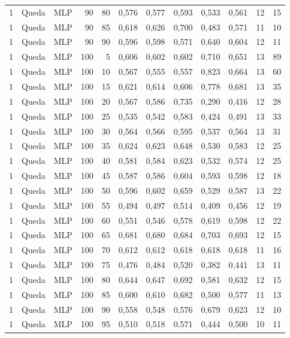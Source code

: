 \begin{longtable}{@{}rllrrrrrrrrr@{}}
1 & Queda & MLP & 90 & 80 & 0,576 & 0,577 & 0,593 & 0,533 & 0,561 & 12 & 15 \\
1 & Queda & MLP & 90 & 85 & 0,618 & 0,626 & 0,700 & 0,483 & 0,571 & 11 & 10 \\
1 & Queda & MLP & 90 & 90 & 0,596 & 0,598 & 0,571 & 0,640 & 0,604 & 12 & 11 \\
1 & Queda & MLP & 100 & 5 & 0,606 & 0,602 & 0,602 & 0,710 & 0,651 & 13 & 89 \\
1 & Queda & MLP & 100 & 10 & 0,567 & 0,555 & 0,557 & 0,823 & 0,664 & 13 & 60 \\
1 & Queda & MLP & 100 & 15 & 0,621 & 0,614 & 0,606 & 0,778 & 0,681 & 13 & 35 \\
1 & Queda & MLP & 100 & 20 & 0,567 & 0,586 & 0,735 & 0,290 & 0,416 & 12 & 28 \\
1 & Queda & MLP & 100 & 25 & 0,535 & 0,542 & 0,583 & 0,424 & 0,491 & 13 & 33 \\
1 & Queda & MLP & 100 & 30 & 0,564 & 0,566 & 0,595 & 0,537 & 0,564 & 13 & 31 \\
1 & Queda & MLP & 100 & 35 & 0,624 & 0,623 & 0,648 & 0,530 & 0,583 & 12 & 25 \\
1 & Queda & MLP & 100 & 40 & 0,581 & 0,584 & 0,623 & 0,532 & 0,574 & 12 & 25 \\
1 & Queda & MLP & 100 & 45 & 0,587 & 0,586 & 0,604 & 0,593 & 0,598 & 12 & 18 \\
1 & Queda & MLP & 100 & 50 & 0,596 & 0,602 & 0,659 & 0,529 & 0,587 & 13 & 22 \\
1 & Queda & MLP & 100 & 55 & 0,494 & 0,497 & 0,514 & 0,409 & 0,456 & 12 & 19 \\
1 & Queda & MLP & 100 & 60 & 0,551 & 0,546 & 0,578 & 0,619 & 0,598 & 12 & 22 \\
1 & Queda & MLP & 100 & 65 & 0,681 & 0,680 & 0,684 & 0,703 & 0,693 & 12 & 15 \\
1 & Queda & MLP & 100 & 70 & 0,612 & 0,612 & 0,618 & 0,618 & 0,618 & 11 & 16 \\
1 & Queda & MLP & 100 & 75 & 0,476 & 0,484 & 0,520 & 0,382 & 0,441 & 13 & 11 \\
1 & Queda & MLP & 100 & 80 & 0,644 & 0,647 & 0,692 & 0,581 & 0,632 & 12 & 15 \\
1 & Queda & MLP & 100 & 85 & 0,600 & 0,610 & 0,682 & 0,500 & 0,577 & 11 & 13 \\
1 & Queda & MLP & 100 & 90 & 0,558 & 0,548 & 0,576 & 0,679 & 0,623 & 12 & 10 \\
1 & Queda & MLP & 100 & 95 & 0,510 & 0,518 & 0,571 & 0,444 & 0,500 & 10 & 11 \\

\end{longtable}
